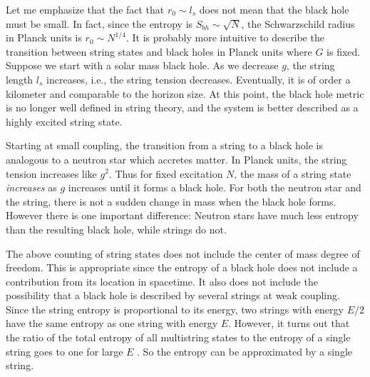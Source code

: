 Let me emphasize that the fact that $r_0 \sim l_s$ does not mean that
the black hole must be small. In fact, since the entropy is $S_{bh} \sim
\sqrt N$, the Schwarzschild radius in Planck units is $r_0 \sim N^{1/4}$.
It is probably more intuitive to describe
the transition between  string states and black holes 
in Planck units where $G$ is fixed. Suppose we start with a solar
mass black hole. As we decrease $g$, the string length
$l_s$ increases, i.e., the string tension decreases.
Eventually, it is of order a kilometer and comparable to the horizon size.
At this point, the black hole metric is no longer well defined in
string theory, and the system is  better described as a highly
excited string state.


Starting at small coupling, the transition from a
string to a black hole is analogous to 
a neutron star which accretes matter. 
In Planck units, the string tension increases like $g^2$. Thus for fixed
excitation $N$, the mass of a string state {\it  increases} as $g$ increases
until it forms a black hole.
For both the neutron star and the string, there is not a sudden change in mass
when the black hole forms.
However there is one important difference: Neutron stars have  much less entropy
than the resulting black hole, while strings do not.

The above counting of string states does not include the center of mass
degree of
freedom. This is appropriate since the entropy of a black hole does not
include a contribution from its location in spacetime. It also does not include
the possibility that a black hole is described by several strings at
weak coupling.  Since the string entropy is proportional to its
energy, two strings with energy $E/2$ have
the same entropy as one string with energy $E$. However, it turns out
that the ratio of the total entropy of all
multistring states to the entropy of a single string goes to one for large
$E$ \cite{mitu}. So the entropy can be approximated by a single string.

